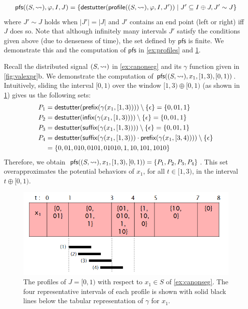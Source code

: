 \small
\begin{align*}
	\mathsf{pfs}((S,{\hb}), \varphi, I, J) = \{\destutter(\mathsf{profile}((S,{\hb}), \varphi, I, J')) \st J' \subseteq I \oplus J, J' \sim J\}
\end{align*}
\normalsize
where $J' \sim J$ holds when $|J'| = |J|$ and $J'$ contains an end point (left or right) iff $J$ does so.
Note that although infinitely many intervals $J'$ satisfy the conditions given above (due to denseness of time), the set defined by $\mathsf{pfs}$ is finite.
We demonstrate this and the computation of $\mathsf{pfs}$ in \cref{ex:profiles} and \cref{fig:profiles}.

\begin{example} \label{ex:profiles}
	Recall the distributed signal $(S, {\rightsquigarrow})$ in \cref{ex:canonseg} and its $\gamma$ function given in \cref{fig:valexpr}b.
	We demonstrate the computation of $\mathsf{pfs}((S,{\rightsquigarrow}), x_1, [1,3), [0,1))$.
	Intuitively, sliding the interval $[0,1)$ over the window $[1,3) \oplus [0,1)$ (as shown in \cref{fig:profiles}) gives us the following sets:
	\begin{align*}
		P_1 &= \mathsf{destutter}(\textsf{prefix}(\gamma(x_1, [1,3)))) \setminus \{\epsilon\} = \{ 0, 01, 1 \}\\
		P_2 &= \mathsf{destutter}(\textsf{infix}(\gamma(x_1, [1,3)))) \setminus \{\epsilon\} = \{ 0, 01, 1 \} \\
		P_3 &= \mathsf{destutter}(\textsf{suffix}(\gamma(x_1, [1,3)))) \setminus \{\epsilon\} = \{ 0, 01, 1 \} \\
		P_4 &= \mathsf{destutter}(\textsf{suffix}(\gamma(x_1, [1,3))) \cdot \textsf{prefix}(\gamma(x_1, [3,4)))) \setminus \{\epsilon\} \\
		&= \{ 0, 01, 010, 0101, 01010, 1, 10, 101, 1010 \}
	\end{align*}
	Therefore, we obtain $\mathsf{pfs}((S,{\rightsquigarrow}), x_1, [1,3), [0,1)) = \{P_1, P_2, P_3, P_4\}$.
	This set overapproximates the potential behaviors of $x_1$, for all $t \in [1,3)$, in the interval $t \oplus [0,1)$.
\end{example}

\begin{figure} 
	\centering
	\includegraphics[scale=0.45]{profiles.png}
	\caption{The profiles of $J = [0,1)$ with respect to $x_1 \in S$ of \cref{ex:canonseg}. The four representative intervals of each profile is shown with solid black lines below the tabular representation of $\gamma$ for $x_1$.}
	\label{fig:profiles}
\end{figure}

